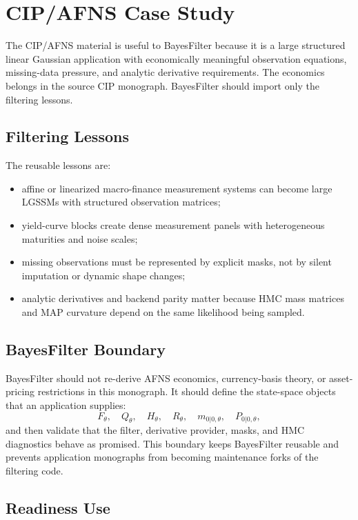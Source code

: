 \chapter{CIP/AFNS Case Study}
\label{ch:bf-cip-afns-case-study}

The CIP/AFNS material is useful to BayesFilter because it is a large structured
linear Gaussian application with economically meaningful observation equations,
missing-data pressure, and analytic derivative requirements.  The economics
belongs in the source CIP monograph.  BayesFilter should import only the
filtering lessons.

\section{Filtering Lessons}
\label{sec:bf-cip-filtering-lessons}

The reusable lessons are:
\begin{itemize}
  \item affine or linearized macro-finance measurement systems can become large
    LGSSMs with structured observation matrices;
  \item yield-curve blocks create dense measurement panels with heterogeneous
    maturities and noise scales;
  \item missing observations must be represented by explicit masks, not by
    silent imputation or dynamic shape changes;
  \item analytic derivatives and backend parity matter because HMC mass
    matrices and MAP curvature depend on the same likelihood being sampled.
\end{itemize}

\section{BayesFilter Boundary}
\label{sec:bf-cip-boundary}

BayesFilter should not re-derive AFNS economics, currency-basis theory, or
asset-pricing restrictions in this monograph.  It should define the state-space
objects that an application supplies:
\[
  F_\theta,\quad Q_\theta,\quad H_\theta,\quad R_\theta,\quad
  m_{0|0,\theta},\quad P_{0|0,\theta},
\]
and then validate that the filter, derivative provider, masks, and HMC
diagnostics behave as promised.  This boundary keeps BayesFilter reusable and
prevents application monographs from becoming maintenance forks of the
filtering code.

\section{Readiness Use}
\label{sec:bf-cip-readiness-use}

